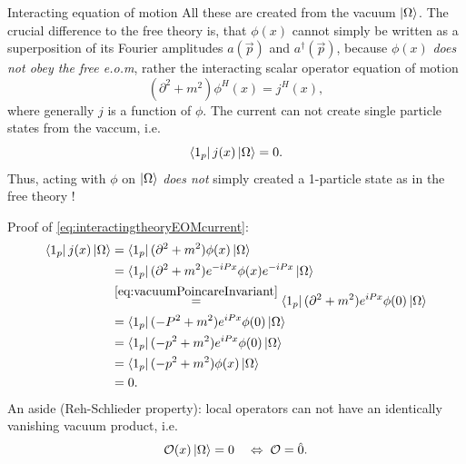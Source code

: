 \begin{mybox}{Interacting equation of motion}
All these are created from the vacuum $\ket{\Omega}$. The crucial difference to the free theory is, that $ \phi(x)$ cannot simply be written as a superposition of its Fourier amplitudes $a(\vec{p})$ and $a^{\dagger}(\vec{p})$, because $\phi(x)$ \emph{does not obey the free e.o.m}, rather the interacting scalar operator equation of motion
\begin{equation}
	(\partial^2+m^2)\phi^H(x) = j^H(x),
\end{equation}
where generally $j$ is a function of $\phi$. The current can not create single particle states from the
vaccum, i.e.
\begin{equation}
\label{eq:interactingtheoryEOMcurrent}
	\bra{1_p} j(x) \ket{\Omega}=0.
\end{equation}
Thus, acting with  $\phi$ on $\ket{\Omega}$ \emph{does not} simply created a 1-particle state as in the free theory !
\end{mybox}
Proof of \ref{eq:interactingtheoryEOMcurrent}:
\begin{align*}
	\bra{1_p} j(x) \ket{\Omega} &= \bra{1_p} (\partial^2+m^2) \phi(x) \ket{\Omega}\\
	&=\bra{1_p} (\partial^2 +m^2) e^{-i Px} \phi(x) e^{-iPx} \ket{\Omega}\\
	&\stackrel{\ref{eq:vacuumPoincareInvariant}}{=} \bra{1_p}(\partial^2+m^2) e^{iPx} \phi(0) \ket{\Omega}\\
	&=\bra{1_p}(-P^2+m^2) e^{iPx} \phi(0) \ket{\Omega} \\
	&= \bra{1_p}(-p^2+m^2) e^{iPx} \phi(0) \ket{\Omega}\\
	&=\bra{1_p}(-p^2+m^2) \phi(x)\ket{\Omega}\\
	&=0.
\end{align*}
An aside (Reh-Schlieder property): local operators can not have an identically vanishing vacuum product, i.e.
\begin{equation}
	\label{eq:rehschlieder}
	\mathcal{O}(x) \ket{\Omega} =0 \quad \Leftrightarrow \;\mathcal{O}  =\hat{ 0}.
\end{equation}
